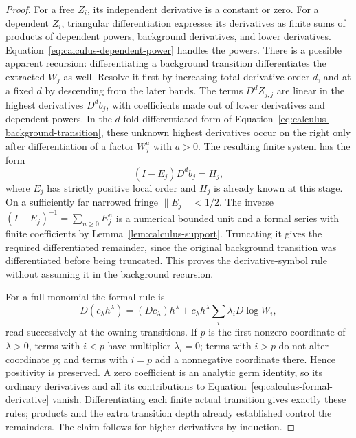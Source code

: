 \begin{proof}
For a free $Z_i$, its independent derivative is a constant or zero.  For a
dependent $Z_i$, triangular differentiation expresses its derivatives as
finite sums of products of dependent powers, background derivatives, and
lower derivatives.  Equation~\eqref{eq:calculus-dependent-power} handles
the powers.  There is a possible apparent recursion: differentiating a
background transition differentiates the extracted $W_j$ as well.
Resolve it first by increasing total derivative order $d$, and at a fixed
$d$ by descending from the later bands.  The terms $D^d Z_{j,j}$ are linear
in the highest derivatives $D^d b_j$, with coefficients made out of lower
derivatives and dependent powers.  In the $d$-fold differentiated form of
Equation~\eqref{eq:calculus-background-transition}, these unknown highest
derivatives occur on the right only after differentiation of a factor
$W_j^a$ with $a>0$.  The resulting finite system has the form
\[
 (I-E_j)D^d b_j=H_j,
\]
where $E_j$ has strictly positive local order and $H_j$ is already known at
this stage.  On a sufficiently far narrowed fringe $\|E_j\|<1/2$.
The inverse $(I-E_j)^{-1}=\sum_{n\ge0}E_j^n$ is a numerical bounded unit
and a formal series with finite coefficients by
Lemma~\ref{lem:calculus-support}.  Truncating it gives the required
differentiated remainder, since the original background transition was
differentiated before being truncated.  This proves the derivative-symbol
rule without assuming it in the background recursion.

For a full monomial the formal rule is
\begin{equation}
 D(c_\lambda h^\lambda)
 =(Dc_\lambda)h^\lambda
   +c_\lambda h^\lambda\sum_i\lambda_i D\log W_i,
 \label{eq:calculus-formal-derivative}
\end{equation}
read successively at the owning transitions.  If $p$ is the first nonzero
coordinate of $\lambda>0$, terms with $i<p$ have multiplier $\lambda_i=0$;
terms with $i>p$ do not alter coordinate $p$; and terms with $i=p$ add a
nonnegative coordinate there.  Hence positivity is preserved.  A zero
coefficient is an analytic germ identity, so its ordinary derivatives and
all its contributions to Equation~\eqref{eq:calculus-formal-derivative}
vanish.  Differentiating each finite actual transition gives exactly these
rules; products and the extra transition depth already established control
the remainders.  The claim follows for higher derivatives by induction.
\end{proof}

